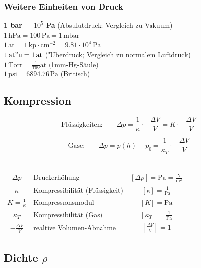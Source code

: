 	
	
	\subsubsection{Weitere Einheiten von Druck}
	\textbf{1 bar = $10^5$ Pa} \qquad (Absulutdruck: Vergleich zu Vakuum)\\
	$ 1 \, \mathrm{hPa} = 100 \, \mathrm{Pa} = 1 \, \mathrm{mbar}$ \\
	$1 \, \mathrm{at} = 1 \, \mathrm{kp \cdot cm^{-2}} = 9.81 \cdot 10^4 \, \mathrm{Pa}$  \\
	$1 \, \mathrm{at"u} = 1 \, \mathrm{at}$ ("Uberdruck; Vergleich zu normalem Luftdruck) \\
	$1 \, \mathrm{Torr} = \frac{1}{760} \mathrm{at}$ (1mm-Hg-Säule) \\
	$1 \, \mathrm{psi} = 6894.76 \, \mathrm{Pa}$ (Britisch) \\


	
	


\subsection{Kompression}
	
	
	$$ \boxed{ \text{Flüssigkeiten:} \qquad \Delta p = \frac{1}{\kappa} \cdot - \frac{\Delta V}{V} = K \cdot - \frac{\Delta V}{V} } $$  
	
	$$ \boxed{  \text{Gase:} \qquad \Delta p = p(h) - p_0 = \frac{1}{\kappa_T} \cdot - \frac{\Delta V}{V} } $$ \\
	
	
	
	\begin{tabular}{c l c}
		$\Delta p$ & Druckerhöhung & $[\Delta p] = \mathrm{Pa = \frac{N}{m^2}}$ \\
		$\kappa$ & Kompressibilität (Flüssigkeit) & $[\kappa] = \mathrm{\frac{1}{Pa}}$ \\
		$K = \frac{1}{\kappa}$ & Kompressionsmodul & $[K] = \mathrm{Pa}$ \\
		$\kappa_T$ & Kompressibilität (Gas) & $[\kappa_T] = \mathrm{\frac{1}{Pa}}$ \\
		$- \frac{\Delta V}{V}$ & realtive Volumen-Abnahme & $[\frac{\Delta V}{V}] = 1$ 
	\end{tabular}
	
	
	
\subsection{Dichte $\rho$}

